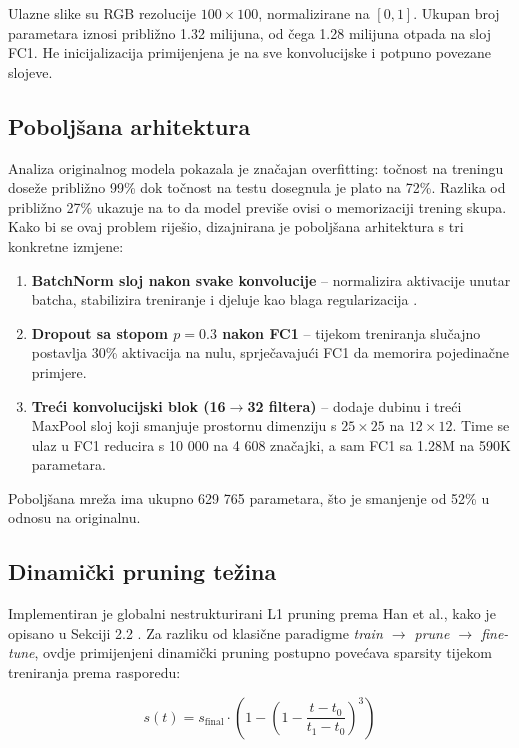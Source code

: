 \documentclass[letterpaper, 10 pt, conference]{ieeeconf}
\begin{document}
Ulazne slike su RGB rezolucije $100\times100$, normalizirane na $[0,1]$.
Ukupan broj parametara iznosi približno 1.32 milijuna, od čega 1.28 milijuna otpada na sloj FC1.
He inicijalizacija primijenjena je na sve konvolucijske i potpuno povezane slojeve.

\subsection{Poboljšana arhitektura}

Analiza originalnog modela pokazala je značajan overfitting: točnost na treningu doseže približno 99\% dok točnost na testu dosegnula je plato na 72\%.
Razlika od približno 27\% ukazuje na to da model previše ovisi o memorizaciji trening skupa.
Kako bi se ovaj problem riješio, dizajnirana je poboljšana arhitektura s tri konkretne izmjene:

\begin{enumerate}
  \item \textbf{BatchNorm sloj nakon svake konvolucije} -- normalizira aktivacije unutar batcha, stabilizira treniranje i djeluje kao blaga regularizacija \cite{ioffe2015batchnorm}.
  \item \textbf{Dropout sa stopom $p=0.3$ nakon FC1} -- tijekom treniranja slučajno postavlja 30\% aktivacija na nulu, sprječavajući FC1 da memorira pojedinačne primjere.
  \item \textbf{Treći konvolucijski blok (16$\rightarrow$32 filtera)} -- dodaje dubinu i treći MaxPool sloj koji smanjuje prostornu dimenziju s $25\times25$ na $12\times12$. Time se ulaz u FC1 reducira s 10 000 na 4 608 značajki, a sam FC1 sa 1.28M na 590K parametara.
\end{enumerate}

Poboljšana mreža ima ukupno 629 765 parametara, što je smanjenje od 52\% u odnosu na originalnu.

\subsection{Dinamički pruning težina}

Implementiran je globalni nestrukturirani L1 pruning prema Han et al., kako je opisano u Sekciji 2.2 \cite{li2023survey}.
Za razliku od klasične paradigme \textit{train $\rightarrow$ prune $\rightarrow$ fine-tune}, ovdje primijenjeni dinamički pruning postupno povećava sparsity tijekom treniranja prema rasporedu:

\begin{equation}
  s(t) = s_{\text{final}} \cdot \left( 1 - \left(1 - \frac{t - t_0}{t_1 - t_0}\right)^3 \right)
\end{equation}
\end{document}
